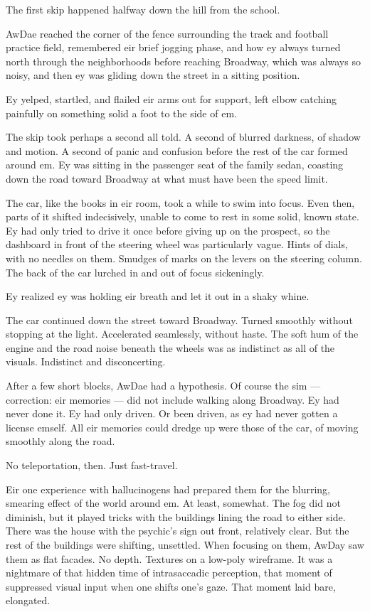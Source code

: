 The first skip happened halfway down the hill from the school.

AwDae reached the corner of the fence surrounding the track and football practice field, remembered eir brief jogging phase, and how ey always turned north through the neighborhoods before reaching Broadway, which was always so noisy, and then ey was gliding down the street in a sitting position.

Ey yelped, startled, and flailed eir arms out for support, left elbow catching painfully on something solid a foot to the side of em.

The skip took perhaps a second all told. A second of blurred darkness, of shadow and motion. A second of panic and confusion before the rest of the car formed around em. Ey was sitting in the passenger seat of the family sedan, coasting down the road toward Broadway at what must have been the speed limit.

The car, like the books in eir room, took a while to swim into focus. Even then, parts of it shifted indecisively, unable to come to rest in some solid, known state. Ey had only tried to drive it once before giving up on the prospect, so the dashboard in front of the steering wheel was particularly vague. Hints of dials, with no needles on them. Smudges of marks on the levers on the steering column. The back of the car lurched in and out of focus sickeningly.

Ey realized ey was holding eir breath and let it out in a shaky whine.

The car continued down the street toward Broadway. Turned smoothly without stopping at the light. Accelerated seamlessly, without haste. The soft hum of the engine and the road noise beneath the wheels was as indistinct as all of the visuals. Indistinct and disconcerting.

After a few short blocks, AwDae had a hypothesis. Of course the sim — correction: eir memories — did not include walking along Broadway. Ey had never done it. Ey had only driven. Or been driven, as ey had never gotten a license emself. All eir memories could dredge up were those of the car, of moving smoothly along the road.

No teleportation, then. Just fast-travel.

Eir one experience with hallucinogens had prepared them for the blurring, smearing effect of the world around em. At least, somewhat. The fog did not diminish, but it played tricks with the buildings lining the road to either side. There was the house with the psychic's sign out front, relatively clear. But the rest of the buildings were shifting, unsettled. When focusing on them, AwDay saw them as flat facades. No depth. Textures on a low-poly wireframe. It was a nightmare of that hidden time of intrasaccadic perception, that moment of suppressed visual input when one shifts one's gaze. That moment laid bare, elongated.

